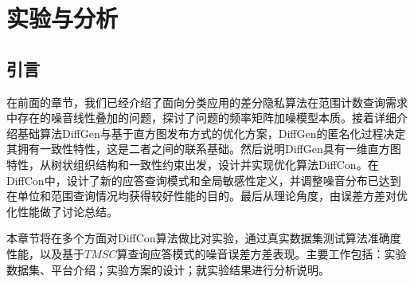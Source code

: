 
\raggedbottom
\chapter{实验与分析}
\label{chap:evaluation}









\section{引言}

在前面的章节，我们已经介绍了面向分类应用的差分隐私算法在范围计数查询需求中存在的噪音线性叠加的问题，探讨了问题的频率矩阵加噪模型本质。接着详细介绍基础算法DiffGen与基于直方图发布方式的优化方案，DiffGen的匿名化过程决定其拥有一致性特性，这是二者之间的联系基础。然后说明DiffGen具有一维直方图特性，从树状组织结构和一致性约束出发，设计并实现优化算法DiffCon。在DiffCon中，设计了新的应答查询模式和全局敏感性定义，并调整噪音分布已达到在单位和范围查询情况均获得较好性能的目的。最后从理论角度，由误差方差对优化性能做了讨论总结。

本章节将在多个方面对DiffCon算法做比对实验，通过真实数据集测试算法准确度性能，以及基于$TMSC$算查询应答模式的噪音误差方差表现。主要工作包括：实验数据集、平台介绍；实验方案的设计；就实验结果进行分析说明。

